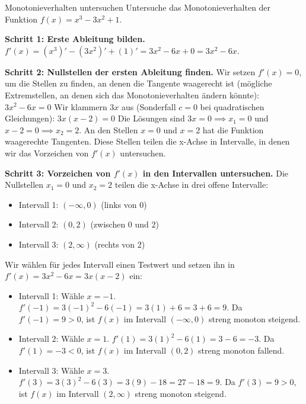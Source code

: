 \begin{beispielumgebung}{Monotonieverhalten untersuchen}
Untersuche das Monotonieverhalten der Funktion $f(x) = x^3 - 3x^2 + 1$.

\textbf{Schritt 1: Erste Ableitung bilden.}
$f'(x) = (x^3)' - (3x^2)' + (1)' = 3x^2 - 6x + 0 = 3x^2 - 6x$.

\textbf{Schritt 2: Nullstellen der ersten Ableitung finden.}
Wir setzen $f'(x) = 0$, um die Stellen zu finden, an denen die Tangente waagerecht ist (mögliche Extremstellen, an denen sich das Monotonieverhalten ändern könnte):
$3x^2 - 6x = 0$
Wir klammern $3x$ aus (Sonderfall $c=0$ bei quadratischen Gleichungen):
$3x(x - 2) = 0$
Die Lösungen sind $3x=0 \implies x_1 = 0$ und $x-2=0 \implies x_2 = 2$.
An den Stellen $x=0$ und $x=2$ hat die Funktion waagerechte Tangenten. Diese Stellen teilen die x-Achse in Intervalle, in denen wir das Vorzeichen von $f'(x)$ untersuchen.

\textbf{Schritt 3: Vorzeichen von $f'(x)$ in den Intervallen untersuchen.}
Die Nullstellen $x_1=0$ und $x_2=2$ teilen die x-Achse in drei offene Intervalle:
\begin{itemize}
    \item Intervall 1: $(-\infty, 0)$ (links von 0)
    \item Intervall 2: $(0, 2)$ (zwischen 0 und 2)
    \item Intervall 3: $(2, \infty)$ (rechts von 2)
\end{itemize}
Wir wählen für jedes Intervall einen Testwert und setzen ihn in $f'(x) = 3x^2 - 6x = 3x(x-2)$ ein:
\begin{itemize}
    \item Intervall 1: Wähle $x=-1$.
    $f'(-1) = 3(-1)^2 - 6(-1) = 3(1) + 6 = 3+6=9$.
    Da $f'(-1) = 9 > 0$, ist $f(x)$ im Intervall $(-\infty, 0)$ streng monoton steigend.
    
    \item Intervall 2: Wähle $x=1$.
    $f'(1) = 3(1)^2 - 6(1) = 3 - 6 = -3$.
    Da $f'(1) = -3 < 0$, ist $f(x)$ im Intervall $(0, 2)$ streng monoton fallend.

    \item Intervall 3: Wähle $x=3$.
    $f'(3) = 3(3)^2 - 6(3) = 3(9) - 18 = 27 - 18 = 9$.
    Da $f'(3) = 9 > 0$, ist $f(x)$ im Intervall $(2, \infty)$ streng monoton steigend.
\end{itemize}


\end{beispielumgebung}
